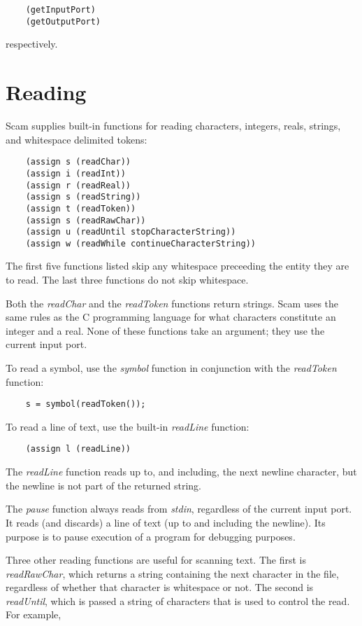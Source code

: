 \begin{verbatim}
    (getInputPort)
    (getOutputPort)
\end{verbatim}

respectively.

\section{Reading}

Scam supplies built-in functions for reading characters,
integers, reals,
strings, and whitespace delimited tokens:

\begin{verbatim}
    (assign s (readChar))
    (assign i (readInt))
    (assign r (readReal))
    (assign s (readString))
    (assign t (readToken))
    (assign s (readRawChar))
    (assign u (readUntil stopCharacterString))
    (assign w (readWhile continueCharacterString))
\end{verbatim}

The first five functions listed skip any whitespace preceeding the
entity they are to read. The last three functions do not skip whitespace.

Both the {\it readChar} and the {\it readToken} functions return strings.
Scam uses the same rules as the C programming language
for what characters constitute an integer and a real.
None of these functions take an argument; they use the current
input port.

To read a symbol, use the {\it symbol} function in conjunction
with the {\it readToken} function:

\begin{verbatim}
    s = symbol(readToken());
\end{verbatim}

To read a line of text, use the built-in {\it readLine} function:

\begin{verbatim}
    (assign l (readLine))
\end{verbatim}

The {\it readLine} function reads up to, and including, the next
newline character, but the newline is not part of the
returned string.

The {\it pause} function always reads from {\it stdin},
regardless of the current input port.
It reads (and discards) a line of text (up to and including the newline).
Its purpose is to pause execution of a program for debugging
purposes.

Three other reading functions are useful for scanning text.
The first is {\it readRawChar}, which returns a string containing
the next character in the file, regardless of whether that
character is whitespace or not.
The second is {\it readUntil}, which is passed a string of characters
that is used to control the read. For example,

